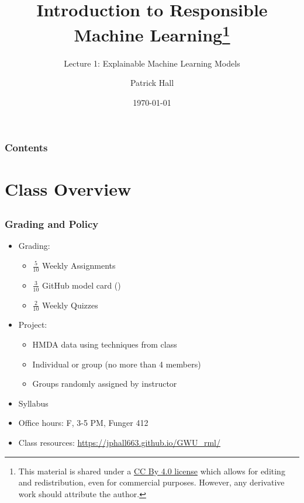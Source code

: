 \documentclass[11pt,aspectratio=169,hyperref={colorlinks}]{beamer}
\author{Patrick Hall}
\title{Introduction to Responsible Machine Learning\footnote{\tiny{This material is shared under a \href{https://creativecommons.org/licenses/by/4.0/deed.ast}{CC By 4.0 license} which allows for editing and redistribution, even for commercial purposes. However, any derivative work should attribute the author.}}}
\subtitle{Lecture 1: Explainable Machine Learning Models}
\institute{The George Washington University}
\date{\today}
\begin{document}
	
	\maketitle
	
	\begin{frame}
	
		\frametitle{Contents}
		
		\tableofcontents{}
		
	\end{frame}
	

	\section{Class Overview}
	\subsection*{}
	
	\begin{frame}
	
		\frametitle{Grading and Policy}
			
		\begin{itemize}
			\item{Grading:}
				\begin{itemize}
					\item{$\frac{5}{10}$ Weekly Assignments}
					\item{$\frac{3}{10}$ GitHub model card (\cite{model_cards})}
                    \item{$\frac{2}{10}$ Weekly Quizzes}
				\end{itemize}
			\item{Project:}	
				\begin{itemize}
					\item{HMDA data using techniques from class}
					\item{Individual or group (no more than 4 members)}
					\item Groups randomly assigned by instructor
				\end{itemize}
			\item{Syllabus}
			\item{Office hours: F, 3-5 PM, Funger 412}
			\item{Class resources: \url{https://jphall663.github.io/GWU_rml/}}	
		\end{itemize}		
			
	\end{frame}
	
\end{document}
